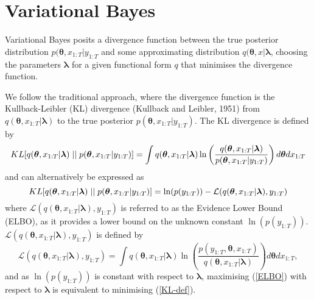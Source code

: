 \documentclass[12pt,a4paper]{article}%
\numberwithin{equation}{section}
\begin{document}
\section{Variational Bayes}

Variational Bayes posits a divergence function between the true posterior distribution $p(\boldsymbol{\theta}, x_{1:T} | y_{1:T}$ and some approximating distribution $q(\boldsymbol{\theta}, x | \boldsymbol{\lambda}$, choosing the parameters $\boldsymbol{\lambda}$ for a given functional form $q$ that minimises the divergence function.

We follow the traditional approach, where the divergence function is the Kullback-Leibler (KL) divergence (Kullback and Leibler, 1951) from $q(\boldsymbol{\theta}, x_{1:T}| \boldsymbol{\lambda})$ to the true posterior $p(\boldsymbol{\theta}, x_{1:T} | y_{1:T})$. The KL divergence is defined by
\begin{equation}
\label{KL-def}
KL[q(\boldsymbol{\theta}, x_{1:T} | \boldsymbol{\lambda})\hspace{.1cm}||\hspace{.1cm}p(\boldsymbol{\theta}, x_{1:T} | y_{1:T})] = \int q(\boldsymbol{\theta}, x_{1:T} | \boldsymbol{\lambda}) \ln \left( \frac{q(\boldsymbol{\theta}, x_{1:T} | \boldsymbol{\lambda})}{p(\boldsymbol{\theta}, x_{1:T} |y_{1:T})}\right) d\boldsymbol{\theta} dx_{1:T}
\end{equation}
and can alternatively be expressed as
\begin{equation}
\label{KL-ELBO}
KL[q(\boldsymbol{\theta}, x_{1:T} | \boldsymbol{\lambda})\hspace{.1cm}||\hspace{.1cm}p(\boldsymbol{\theta}, x_{1:T} | y_{1:T})] = \ln(p(y_{1:T})) - \mathcal{L}(q(\boldsymbol{\theta}, x_{1:T} | \boldsymbol{\lambda}), y_{1:T})
\end{equation}
where $\mathcal{L}(q(\boldsymbol{\theta}, x_{1:T} | \boldsymbol{\lambda}), y_{1:T})$ is referred to as the Evidence Lower Bound (ELBO), as it provides a lower bound on the unknown constant $\ln(p(y_{1:T}))$.  $\mathcal{L}(q(\boldsymbol{\theta}, x_{1:T} | \boldsymbol{\lambda}), y_{1:T})$ is defined by
\begin{equation}
\label{ELBO}
\mathcal{L}(q(\boldsymbol{\theta}, x_{1:T} | \boldsymbol{\lambda}), y_{1:T}) = \int q(\boldsymbol{\theta}, x_{1:T} | \boldsymbol{\lambda}) \ln \left( \frac{p(y_{1:T},\boldsymbol{\theta}, x_{1:T})}{q(\boldsymbol{\theta}, x_{1:T} | \boldsymbol{\lambda})} \right) d\boldsymbol{\theta}dx_{1:T},
\end{equation}
and as $\ln(p(y_{1:T}))$ is constant with respect to $\boldsymbol{\lambda}$, maximising (\ref{ELBO}) with respect to $\boldsymbol{\lambda}$ is equivalent to minimising (\ref{KL-def}). 
\end{document}
